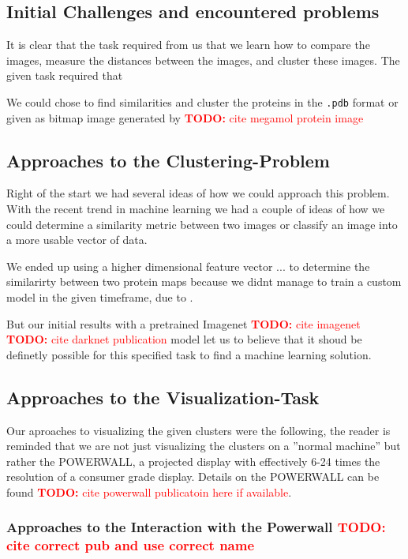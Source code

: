 \documentclass[journal]{vgtc}       %
\newcommand{\todo}[1]{\textcolor{red}{\textbf{TODO:} #1}}
\begin{document}
\subsection{Initial Challenges and encountered problems}

It is clear that the task required from us that we learn how to compare the images, measure the distances between the images, and cluster these images.
The given task required that 

We could chose to find similarities and cluster the proteins in the \verb|.pdb| format or given as bitmap image generated by \todo{cite megamol protein image}



\subsection{Approaches to the Clustering-Problem}

Right of the start we had several ideas of how we could approach this problem. 
With the recent trend in machine learning we had a couple of ideas of how we could determine a similarity metric between two images or classify an image into a more usable vector of data.

We ended up using a higher dimensional feature vector ... to determine the similarirty between two protein maps because we didnt manage to train a custom model in the given timeframe, due to .

But our initial results with a pretrained Imagenet \todo{cite imagenet} \todo{cite darknet publication} model let us to believe that it shoud be definetly possible for this specified task to find a machine learning solution. 

\subsection{Approaches to the Visualization-Task}

Our aproaches to visualizing the given clusters were the following, the reader is reminded that we are not just visualizing the clusters on a ''normal machine'' but rather the POWERWALL, a projected display with effectively 6-24 times the resolution of a consumer grade display. Details on the POWERWALL can be found \todo{cite powerwall publicatoin here if available}.


\subsubsection{Approaches to the Interaction with the Powerwall \todo{cite correct pub and use correct name}}
\end{document}
